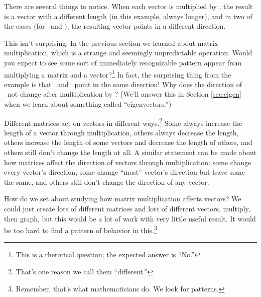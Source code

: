 There are several things to notice. When each vector is multiplied by \tta, the result is a vector with a different length (in this example, always longer), and in two of the cases (for \vy\ and \vz), the resulting vector points in a different direction. 

This isn't surprising. In the previous section we learned about matrix multiplication, which is a strange and seemingly unpredictable operation. Would you expect to see some sort of immediately recognizable pattern appear from multiplying a matrix and a vector?\footnote{This is a rhetorical question; the expected answer is ``No.''} In fact, the surprising thing from the example is that \vx\ and \tta\vx\ point in the same direction! Why does the direction of \vx\ not change after multiplication by \tta? (We'll answer this in Section \ref{sec:eigen} when we learn about something called ``eigenvectors.'')


Different matrices act on vectors in different ways.\footnote{That's one reason we call them ``different.''} Some always increase the length of a vector through  multiplication, others always decrease the length, others increase the length of some vectors and decrease the length of others, and others still don't change the length at all. A similar statement can be made about how matrices affect the direction of vectors through multiplication: some change every vector's direction, some change ``most'' vector's direction but leave some the same, and others still don't change the direction of any vector.

How do we set about studying how matrix multiplication affects vectors? We could just create lots of different matrices and lots of different vectors, multiply, then graph, but this would be a lot of work with very little useful result. It would be too hard to find a pattern of behavior in this.\footnote{Remember, that's what mathematicians do. We look for patterns.}

